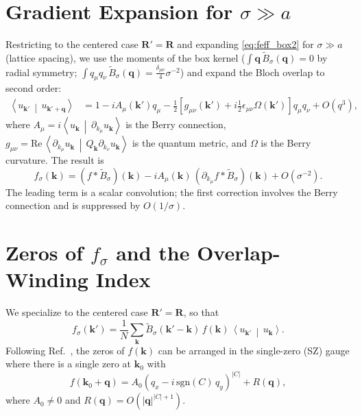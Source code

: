 \documentclass[aps,prb,onecolumn,nofootinbib,superscriptaddress]{revtex4-2}
\newcommand{\mbf}[1]{\mathbf{#1}}
\newcommand{\braket}[2]{\left\langle#1\,\middle|\,#2\right\rangle}
\begin{document}
\section{Gradient Expansion for \texorpdfstring{$\sigma \gg a$}{sigma much greater than a}}
\label{sec:gradient}

Restricting to the centered case $\mbf{R}'=\mbf{R}$ and expanding \eqref{eq:feff_box2} for $\sigma \gg a$ (lattice spacing), we use the moments of the box kernel ($\int \mbf{q}\,\widetilde{B}_\sigma(\mbf{q}) = 0$ by radial symmetry; $\int q_\mu q_\nu\,\widetilde{B}_\sigma(\mbf{q}) = \frac{\delta_{\mu\nu}}{4}\sigma^{-2}$) and expand the Bloch overlap to second order:
\begin{align}
\braket{u_{\mbf{k}'}}{u_{\mbf{k}'+\mbf{q}}} &= 1 - i A_\mu(\mbf{k}') q_\mu - \frac{1}{2}\left[g_{\mu\nu}(\mbf{k}') + i\frac{1}{2}\epsilon_{\mu\nu}\Omega(\mbf{k}')\right]q_\mu q_\nu + O(q^3),
\end{align}
where $A_\mu = i\braket{u_{\mbf{k}}}{\partial_{k_\mu} u_{\mbf{k}}}$ is the Berry connection, $g_{\mu\nu} = \mathrm{Re}\,\braket{\partial_{k_\mu}u_{\mbf{k}}}{Q_{\mbf{k}}\partial_{k_\nu}u_{\mbf{k}}}$ is the quantum metric, and $\Omega$ is the Berry curvature. The result is
\begin{equation}\label{eq:fsigma_expansion}
f_\sigma(\mbf{k}) = (f * \widetilde{B}_\sigma)(\mbf{k}) - i A_\mu(\mbf{k})\,(\partial_{k_\mu}f * \widetilde{B}_\sigma)(\mbf{k}) + O(\sigma^{-2}).
\end{equation}
The leading term is a scalar convolution; the first correction involves the Berry connection and is suppressed by $O(1/\sigma)$.

\section{Zeros of \texorpdfstring{$f_\sigma$}{f-sigma} and the Overlap-Winding Index}
\label{sec:zeros}

We specialize to the centered case $\mbf{R}'=\mbf{R}$, so that
\begin{equation}\label{eq:fsig_recall}
f_\sigma(\mbf{k}') = \frac{1}{N}\sum_{\mbf{k}} \widetilde{B}_\sigma(\mbf{k}'-\mbf{k})\, f(\mbf{k})\,\braket{u_{\mbf{k}'}}{u_{\mbf{k}}}.
\end{equation}
Following Ref.~\cite{Li2024}, the zeros of $f(\mbf{k})$ can be arranged in the single-zero (SZ) gauge where there is a single zero at $\mbf{k}_0$ with
\begin{equation}\label{eq:f_zero}
f(\mbf{k}_0 + \mbf{q}) = A_0 (q_x - i\,\mathrm{sgn}(C)\, q_y)^{|C|} + R(\mbf{q}),
\end{equation}
where $A_0 \neq 0$ and $R(\mbf{q}) = O(|\mbf{q}|^{|C|+1})$.
\end{document}
